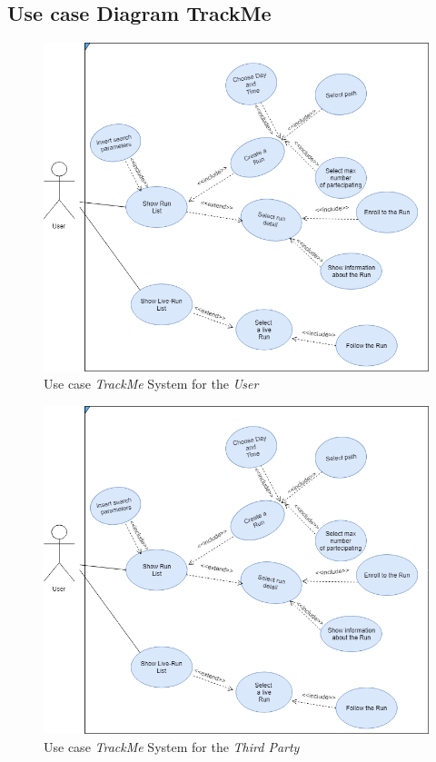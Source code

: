 \subsection{Use case Diagram TrackMe}

\begin{figure}[H]
    \centering
    \includegraphics[scale=0.4]{rasdL/Pictures/run.png}
    \caption{Use case  \emph{TrackMe} System for the \emph{User}}
\end{figure}

\begin{figure}[H]
    \centering
    \includegraphics[scale=0.4]{rasdL/Pictures/run.png}
    \caption{Use case  \emph{TrackMe} System for the \emph{Third Party}}
\end{figure}


